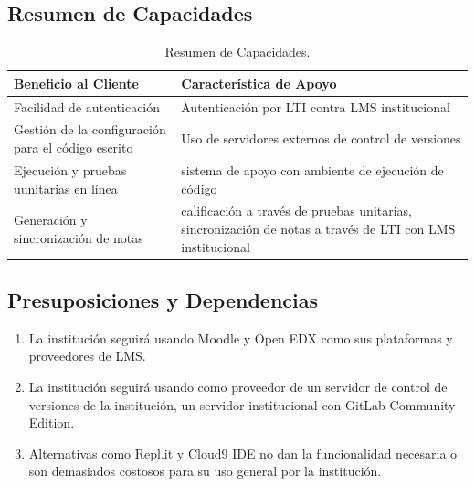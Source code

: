 \subsection{Resumen de Capacidades}
\begin{table}[h!]
  \begin{tabular}{|p{}|p{}|}
    \hline
    \textbf{Beneficio al Cliente} & \textbf{Característica de Apoyo} \\
    \hline
    Facilidad de autenticación & Autenticación por LTI contra LMS institucional \\
    \hline
    Gestión de la configuración para el código escrito & Uso de servidores externos de control de versiones \\
    \hline
    Ejecución y pruebas uunitarias en línea & sistema de apoyo con ambiente de ejecución de código \\
    \hline
    Generación y sincronización de notas & calificación a través de pruebas unitarias, sincronización de notas a través de LTI con LMS institucional \\
    \hline
  \end{tabular}
  \caption{Resumen de Capacidades.}
  \label{res-cap}
\end{table}

\subsection{Presuposiciones y Dependencias}
\begin{enumerate}
	\item La institución seguirá usando Moodle y Open EDX como sus plataformas y proveedores de LMS.
	\item La institución seguirá usando como proveedor de un servidor de control de versiones de la institución, un servidor institucional con GitLab Community Edition.
	\item Alternativas como Repl.it y Cloud9 IDE no dan la funcionalidad necesaria o son demasiados costosos para su uso general por la institución.
\end{enumerate}


